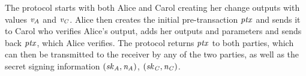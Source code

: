 The protocol starts with both Alice and Carol creating her change outputs with values $\mathit{v}_{\mathit{A}}$ and $\mathit{v}_{\mathit{C}}$.
Alice then creates the initial pre-transaction $\mathit{ptx}$ and sends it to Carol who verifies Alice's output, adds her outputs and parameters and sends back $\mathit{ptx}$, which Alice verifies.
The protocol returns $\mathit{ptx}$ to both parties, which can then be transmitted to the receiver by any of the two parties, as well as the secret signing information $(\mathit{sk}_{\mathit{A}}, \mathit{\mathit{n}_{\mathit{A}}})$, $(\mathit{sk}_{\mathit{C}}, \mathit{\mathit{n}_{\mathit{C}}})$.

\begin{landscape}
    \thispagestyle{plain}
    \begin{figure}
\end{figure}
\end{landscape}
